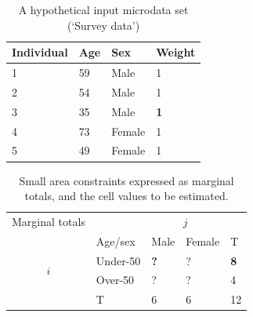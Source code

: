\documentclass[a4paper, 11pt, twoside]{article}
\begin{document}
\begin{table}[h]
\caption{A hypothetical input microdata set (`Survey data')
}
\label{t:w}
\begin{center}
 \begin{tabular}{llll}
\toprule
{Individual } & {Age} & {Sex}  & {Weight} \\
\midrule
1 & 59 & Male  & 1 \\
2 & 54 & Male & 1 \\
3 & {35} & {Male} & \textbf{1} \\
4 & 73 & Female & 1 \\
5 & 49 & Female & 1 \\
\bottomrule
\end{tabular}
\end{center}
\end{table}

\begin{table}[H]
\end{table}
\vspace{1cm}

\begin{table}[h]
\centering
\caption[Small area constraints expressed as marginal totals]{Small
area constraints expressed as marginal totals, and the cell
values to be estimated.}
\begin{tabular}{cllll}\toprule
Marginal totals&  & \multicolumn{2}{c}{$j$} & \\
& Age/sex & Male & Female & T\\ \midrule
\multirow{2}{*}{$i$} & Under-50 & \textbf{?} & ? & \textbf{8}\\
& Over-50 & ? & ? &4 \\
& T & 6 & 6 &12\\
\bottomrule
\end{tabular}
\label{t:s2}
\end{table}
\end{document}
